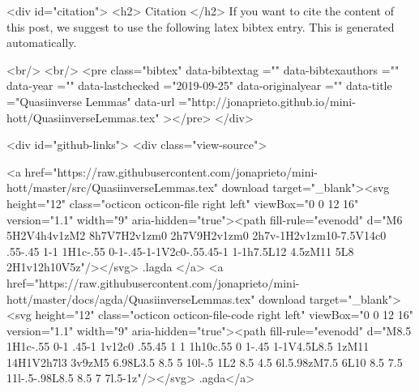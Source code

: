   
  <div id="citation">
  <h2> Citation </h2>
  If you want to cite the content of this post,
  we suggest to use the following latex bibtex entry.
  This is generated automatically.

  <br/>
  <br/>
  <pre class="bibtex"
       data-bibtextag =""
       data-bibtexauthors =""
       data-year =""
       data-lastchecked ="2019-09-25"
       data-originalyear =""
       data-title ="Quasiinverse Lemmas"
       data-url ="http://jonaprieto.github.io/mini-hott/QuasiinverseLemmas.tex"
  ></pre>
  </div>
  

  <div id="github-links">
    <div class="view-source">
      
        <a href="https://raw.githubusercontent.com/jonaprieto/mini-hott/master/src/QuasiinverseLemmas.tex" download target="_blank"><svg height="12" class="octicon octicon-file right left" viewBox="0 0 12 16" version="1.1" width="9" aria-hidden="true"><path fill-rule="evenodd" d="M6 5H2V4h4v1zM2 8h7V7H2v1zm0 2h7V9H2v1zm0 2h7v-1H2v1zm10-7.5V14c0 .55-.45 1-1 1H1c-.55 0-1-.45-1-1V2c0-.55.45-1 1-1h7.5L12 4.5zM11 5L8 2H1v12h10V5z"/></svg> .lagda </a>
        <a href="https://raw.githubusercontent.com/jonaprieto/mini-hott/master/docs/agda/QuasiinverseLemmas.tex" download target="_blank"><svg height="12" class="octicon octicon-file-code right left" viewBox="0 0 12 16" version="1.1" width="9" aria-hidden="true"><path fill-rule="evenodd" d="M8.5 1H1c-.55 0-1 .45-1 1v12c0 .55.45 1 1 1h10c.55 0 1-.45 1-1V4.5L8.5 1zM11 14H1V2h7l3 3v9zM5 6.98L3.5 8.5 5 10l-.5 1L2 8.5 4.5 6l.5.98zM7.5 6L10 8.5 7.5 11l-.5-.98L8.5 8.5 7 7l.5-1z"/></svg> .agda</a>
      
